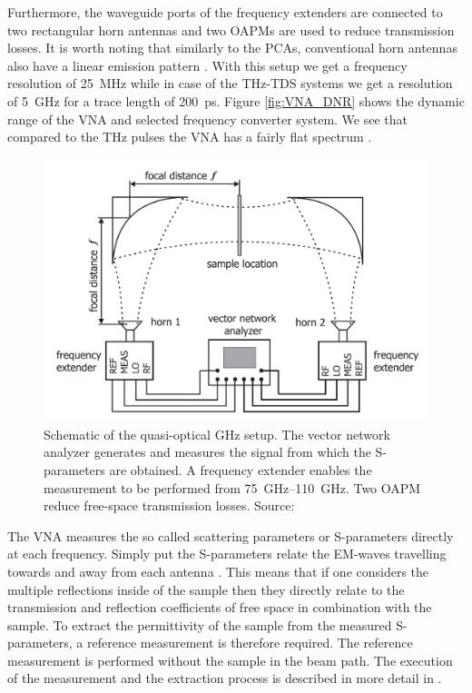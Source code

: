Furthermore, the waveguide ports of the frequency extenders are connected to two rectangular horn antennas and two OAPMs are used to reduce transmission losses. It is worth noting that similarly to the PCAs, conventional horn antennas also have a linear emission pattern \cite{ShiChen2013}. With this setup we get a frequency resolution of \SI{25}{\mega \hertz} while in case of the THz-TDS systems we get a resolution of \SI{5}{\giga \hertz} for a trace length of \SI{200}{\pico \second}. Figure \ref{fig:VNA_DNR} shows the dynamic range of the VNA and selected frequency converter system. We see that compared to the THz pulses the VNA has a fairly flat spectrum \cite{VNADNR2013, Kazemipour2015}.

\begin{figure}[H]
    \centering
    \includegraphics[scale=0.4]{images/setup/ghz.png}
    \caption{Schematic of the quasi-optical GHz setup. The vector network analyzer generates and measures the signal from which the S-parameters are obtained. A frequency extender enables the measurement to be performed from \SIrange{75}{110}{\giga \hertz}. Two OAPM reduce free-space transmission losses. Source: \cite{Kazemipour2015}}
    \label{fig:GHz_setup}
\end{figure}

The VNA measures the so called scattering parameters or S-parameters directly at each frequency. Simply put the S-parameters relate the EM-waves travelling towards and away from each antenna \cite{Caspers2012}. This means that if one considers the multiple reflections inside of the sample then they directly relate to the transmission and reflection coefficients of free space in combination with the sample. To extract the permittivity of the sample from the measured S-parameters, a reference measurement is therefore required. The reference measurement is performed without the sample in the beam path. The execution of the measurement and the extraction process is described in more detail in \cite{Kazemipour2015}. 
